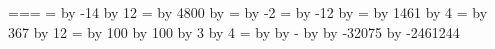 %
%

\begingroup
{}=\year {}=\month {}=\day
{}= \advance{} by -14\relax \divide{} by 12\relax
{}= \advance{} by 4800\relax \advance{} by 
= \advance{} by -2\relax
{}= \multiply{} by -12\relax \advance{} by 
= \multiply{} by 1461\relax \divide{} by 4\relax
{}= \multiply{} by 367\relax \divide{} by 12\relax
{}= \advance{} by 100\relax
\divide{} by 100\relax
\multiply{} by 3\relax
\divide{} by 4\relax
{}= \advance{} by  \advance{} by -
\advance{} by  \advance{} by -32075\relax
\advance{} by -2461244\relax   %
\xdef\cubliday{\the\count18}
\endgroup



